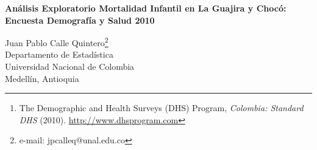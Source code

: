 \documentclass[12pt, titlepage, reqno]{article}
\theoremstyle{plain}
\begin{document}
 \begin{titlepage}

 \begin{center}

 \textbf{Análisis Exploratorio Mortalidad Infantil en La Guajira y Chocó:}\\
 
 \textbf{Encuesta Demografía y Salud 2010}\\
 
 
 \vspace{10ex}

Juan Pablo Calle Quintero\footnote{e-mail: jpcalleq@unal.edu.co}\\

 Departamento de Estadística \\
 
 Universidad Nacional de Colombia \\

 Medellín, Antioquia

 \end{center}

 \end{titlepage}

 \begin{abstract}

La mortalidad infantil suele ser un indicador utilizado para medir el desarrollo de un país. Un nivel alto en este indicador está asociado por lo general a desnutrición maternoinfantil, a la carencia de servicios públicos y a otros factores socioeconómicos como la violencia. El objetivo de este trabajo es realizar un análisis descriptivo de la mortalidad infantil en Colombia, con especial énfasis en los departamentos de La Guajira y Chocó, que son los que han tenido mayor índice de mortalidad históricamente. Este trabajo es meramente exploratorio y lo que pretende es abrir un espacio de discusión sobre la mortalidad infantil en Colombia para emprender estudios más profundos. Se toma como fuente de información la Encuesta de Demografía y Salud del 2010 realizada por Demographic and Health Survey Program\footnote{The Demographic and Health Surveys (DHS) Program, \emph{Colombia: Standard DHS} (2010). \href{http://www.dhsprogram.com/data/dataset/Colombia_Standard-DHS_2010.cfm?flag=0}{http://www.dhsprogram.com}}. Se analizan los fallecimientos de niños menores a un año entre el 2000 y 2009 y se encuentran posibles asociaciones con variables como el estado civil de la madre, su nivel educativo y la carencia de sanitario y de energía.


 \end{abstract}
\end{document}
